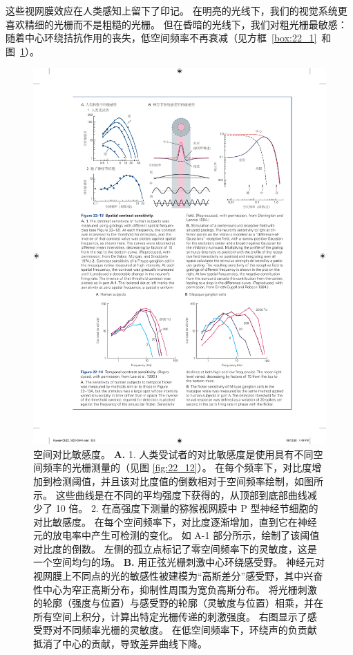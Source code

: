 这些视网膜效应在人类感知上留下了印记。
在明亮的光线下，我们的视觉系统更喜欢精细的光栅而不是粗糙的光栅。
但在昏暗的光线下，我们对粗光栅最敏感：随着中心环绕拮抗作用的丧失，低空间频率不再衰减（见方框~\ref{box:22_1}~和图~\ref{fig:22_13}）。


\begin{figure}[htbp]
	\centering
	\includegraphics[width=1.0\linewidth]{chap22/fig_22_13}
	\caption{空间对比敏感度。 
		\textbf{A.} 1. 人类受试者的对比敏感度是使用具有不同空间频率的光栅测量的（见图 \ref{fig:22_12}）。 
		在每个频率下，对比度增加到检测阈值，并且该对比度值的倒数相对于空间频率绘制，如图所示。 
		这些曲线是在不同的平均强度下获得的，从顶部到底部曲线减少了 10 倍\cite{de1974psychophysical}。
		2. 在高强度下测量的猕猴视网膜中 P 型神经节细胞的对比敏感度。 
		在每个空间频率下，对比度逐渐增加，直到它在神经元的放电率中产生可检测的变化。
		如 A-1 部分所示，绘制了该阈值对比度的倒数。 
		左侧的孤立点标记了零空间频率下的灵敏度，这是一个空间均匀的场\cite{derrington1984spatial}。 
		\textbf{B.} 用正弦光栅刺激中心环绕感受野。
		神经元对视网膜上不同点的光的敏感性被建模为“高斯差分”感受野，其中兴奋性中心为窄正高斯分布，抑制性周围为宽负高斯分布。
		将光栅刺激的轮廓（强度与位置）与感受野的轮廓（灵敏度与位置）相乘，并在所有空间上积分，计算出特定光栅传递的刺激强度。
		右图显示了感受野对不同频率光栅的灵敏度。
		在低空间频率下，环绕声的负贡献抵消了中心的贡献，导致差异曲线下降\cite{enroth1984functional}。}
	\label{fig:22_13}
\end{figure}


